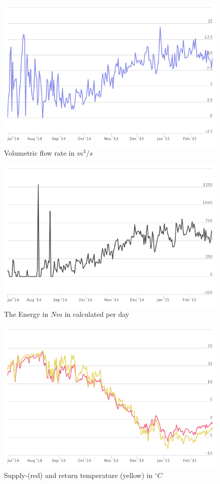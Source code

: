 \documentclass{scrartcl}
\begin{document}
\begin{figure}[H]
  \centering
  \includegraphics[width=0.8\linewidth]{img/Volumenstrom.png}
  \caption{Volumetric flow rate in $m^3 / s$}
\end{figure}


\begin{figure}[H]
  \centering
  \includegraphics[width=0.8\linewidth]{img/Energie.png}
  \caption{The Energy in $Nm$ in calculated per day}
\end{figure}

\begin{figure}[H]
  \centering
  \includegraphics[width=0.8\linewidth]{img/lauftemperature.png}
  \caption{Supply-(red) and return temperature (yellow) in $^\circ C$}
\end{figure}
\end{document}
